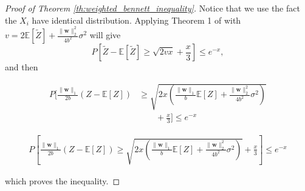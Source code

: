 \documentclass[letterpaper]{article} %
\def\DoubleColumn{}
\def\DoubleColumnEnd{}
\def\SingleColumn{}
\def\SingleColumnEnd{}
\newtheorem{lemma}{Lemma}
\newcommand{\E}{\mathbb{E}}
\newcommand{\Pro}{P}
\newcommand{\weight}{\mathbf{w}}
\newcommand{\normo}[1]{\|#1\|_1}
\newcommand{\citep}[3]{(#1\ \citeauthor{#3}\ \citeyear{#3},\ #2)}
\begin{document}
\begin{proof}[Proof of Theorem \ref{th:weighted_bennett_inequality}]
    Notice that we use the fact the $X_i$ have identical distribution.
    Applying Theorem 1 of \cite{Bousquet2002a} with $v=2\E[\widetilde{Z}]+\frac{\|\weight{}\|_2^2}{4b^2}\sigma^2$ will give
    \[\Pro[\widetilde{Z}-\E[\widetilde{Z}]\ge \sqrt{2vx}+\frac{x}{3}]\le e^{-x},\]
    and then
    \DoubleColumn
    \begin{align*}
        \Pro[\frac{\normo{\weight{}}}{2b}(Z-\E[Z])&\ge \sqrt{2x(\frac{\normo{\weight{}}}{b}\E[Z]+\frac{\|\weight{}\|_2^2}{4b^2}\sigma^2)}\\
        &\qquad+\frac{x}{3}] \le e^{-x}
    \end{align*}
    \DoubleColumnEnd
    \SingleColumn
    \begin{align*}
        \Pro\left[\frac{\normo{\weight{}}}{2b}(Z-\E[Z])\ge \sqrt{2x(\frac{\normo{\weight{}}}{b}\E[Z]+\frac{\|\weight{}\|_2^2}{4b^2}\sigma^2)}+\frac{x}{3}\right] \le e^{-x}
    \end{align*}
    \SingleColumnEnd
    which proves the inequality.
\end{proof}

\end{document}
